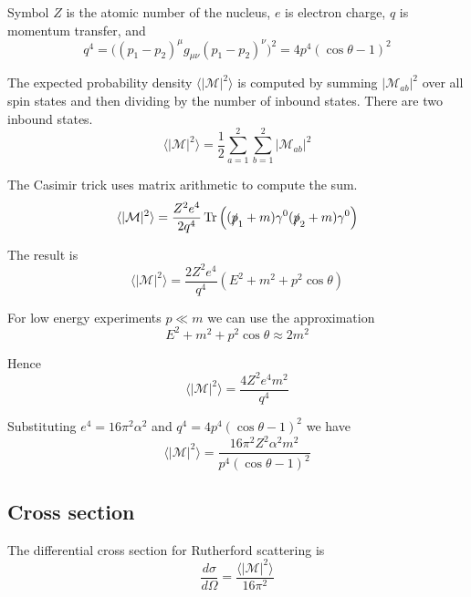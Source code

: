 Symbol $Z$ is the atomic number of the nucleus, $e$ is electron charge,
$q$ is momentum transfer, and
\begin{equation*}
q^4=\bigl((p_1-p_2)^\mu g_{\mu\nu}(p_1-p_2)^\nu\bigr)^2=4p^4(\cos\theta-1)^2
\end{equation*}

The expected probability density
$\langle\vert\mathcal{M}\vert^2\rangle$
is computed by summing $|\mathcal{M}_{ab}|^2$
over all spin states and then dividing by the number of inbound states.
There are two inbound states.
\begin{equation*}
\langle\vert\mathcal{M}\vert^2\rangle
=\frac{1}{2}\sum_{a=1}^2\sum_{b=1}^2\left|\mathcal{M}_{ab}\right|^2
\end{equation*}

The Casimir trick uses matrix arithmetic to compute the sum.
\begin{equation*}
\langle\vert\mathcal{M}\vert^2\rangle
=\frac{Z^2e^4}{2q^4}\mathop{\rm Tr}\left((\slashed{p}_1+m)\gamma^0(\slashed{p}_2+m)\gamma^0\right)
\end{equation*}

The result is
\begin{equation*}
\langle\vert\mathcal{M}\vert^2\rangle
=\frac{2Z^2e^4}{q^4}\left(E^2+m^2+p^2\cos\theta\right)
\end{equation*}

For low energy experiments $p\ll m$ we can use the approximation
\begin{equation*}
E^2+m^2+p^2\cos\theta\approx2m^2
\end{equation*}

Hence
\begin{equation*}
\langle|\mathcal{M}|^2\rangle=\frac{4Z^2e^4m^2}{q^4}
\end{equation*}

Substituting $e^4=16\pi^2\alpha^2$ and $q^4=4p^4(\cos\theta-1)^2$ we have
\begin{equation*}
\langle|\mathcal{M}|^2\rangle=\frac{16\pi^2Z^2\alpha^2m^2}{p^4(\cos\theta-1)^2}
\end{equation*}

\subsection*{Cross section}
The differential cross section for Rutherford scattering is
\begin{equation*}
\frac{d\sigma}{d\Omega}=\frac{\langle|\mathcal{M}|^2\rangle}{16\pi^2}
\end{equation*}


